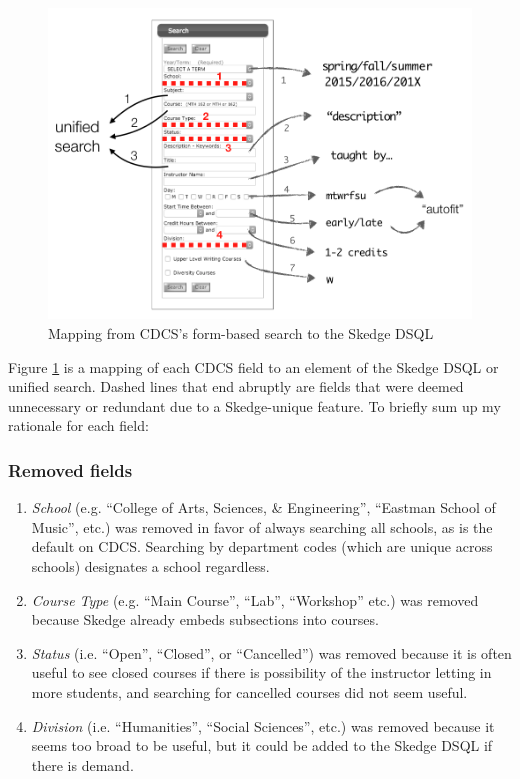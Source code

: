 \begin{figure}[ht]
  \centering
  \vspace{10pt}
  \includegraphics[width=14cm]{images/search-mapping}
  \caption{Mapping from CDCS's form-based search to the Skedge DSQL} \label{fig:search-mapping}
\end{figure}

Figure \ref{fig:search-mapping} is a mapping of each CDCS field to an element of the Skedge DSQL or unified search. Dashed lines that end abruptly are fields that were deemed unnecessary or redundant due to a Skedge-unique feature. To briefly sum up my rationale for each field:

\onehalfspacing

\subsubsection{Removed fields}

\begin{enumerate}

  \item \emph{School} (e.g. ``College of Arts, Sciences, \& Engineering'', ``Eastman School of Music'', etc.) was removed in favor of always searching all schools, as is the default on CDCS. Searching by department codes (which are unique across schools) designates a school regardless.

  \item \emph{Course Type} (e.g. ``Main Course'', ``Lab'', ``Workshop'' etc.) was removed because Skedge already embeds subsections into courses.

  \item \emph{Status} (i.e. ``Open'', ``Closed'', or ``Cancelled'') was removed because it is often useful to see closed courses if there is possibility of the instructor letting in more students, and searching for cancelled courses did not seem useful.

  \item \emph{Division} (i.e. ``Humanities'', ``Social Sciences'', etc.) was removed because it seems too broad to be useful, but it could be added to the Skedge DSQL if there is demand.

\end{enumerate}

